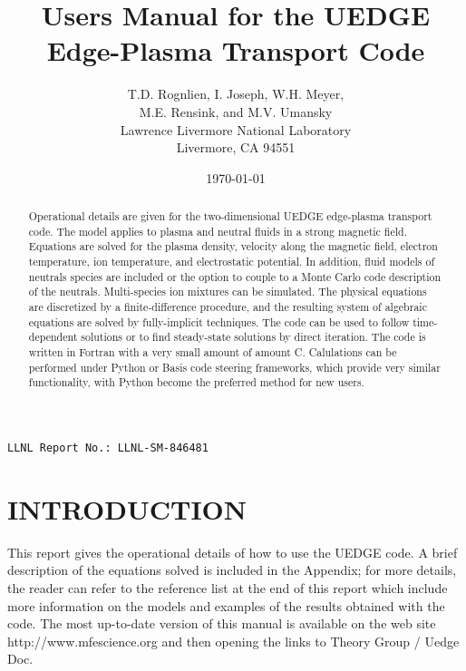 \documentclass [12pt]{article}
\title{Users Manual for the {\sf UEDGE} Edge-Plasma Transport Code}
\author{T.D. Rognlien, I. Joseph, W.H. Meyer, \\ M.E. Rensink, and M.V. Umansky \\
  Lawrence Livermore National Laboratory \\
  Livermore, CA 94551}
\date{\today }
\begin{document}
\maketitle
\begin{flushleft}
   \texttt{LLNL Report No.: LLNL-SM-846481}
\end{flushleft}

\begin{abstract}

  Operational details are given for the two-dimensional {\sf UEDGE}
  edge-plasma transport code.  The model applies to plasma and neutral
  fluids in a strong magnetic field. Equations are solved for the
  plasma density, velocity along the magnetic field, electron
  temperature, ion temperature, and electrostatic potential.  In
  addition, fluid models of neutrals species are included or the
  option to couple to a Monte Carlo code description of the neutrals.
  Multi-species ion mixtures can be simulated.  The physical equations
  are discretized by a finite-difference procedure, and the resulting
  system of algebraic equations are solved by fully-implicit
  techniques.  The code can be used to follow time-dependent solutions
  or to find steady-state solutions by direct iteration.  The code is
  written in Fortran with a very small amount of amount C.  Calulations can be
  performed under Python or Basis code steering frameworks, which
  provide very similar functionality, with Python become the preferred
  method for new users.

\end{abstract}

\tableofcontents


\pagebreak

\section{INTRODUCTION}

This report gives the operational details of how to use the {\sf UEDGE} code.
A brief description of the equations solved is included in the Appendix; for
more details, the reader can refer to the reference list at the end of this
report which include more information on the models and examples of the
results obtained with the code. The most up-to-date version of this manual
is available on the web site {\sf http://www.mfescience.org} and then opening
the links to Theory Group / Uedge Doc.
\end{document}
